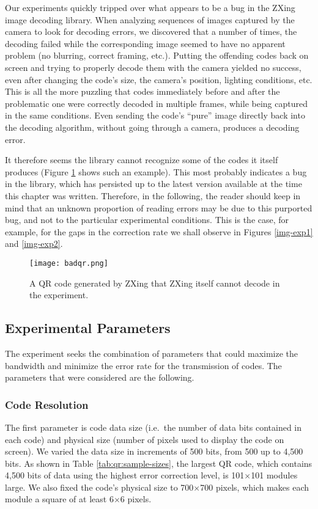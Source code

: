 Our experiments quickly tripped over what appears to be a bug in the ZXing image decoding library. When analyzing sequences of images captured by the camera to look for decoding errors, we discovered that a number of times, the decoding failed while the corresponding image seemed to have no apparent problem (no blurring, correct framing, etc.). Putting the offending codes back on screen and trying to properly decode them with the camera yielded no success, even after changing the code's size, the camera's position, lighting conditions, etc. This is all the more puzzling that codes immediately before and after the problematic one were correctly decoded in multiple frames, while being captured in the same conditions. Even sending the code's ``pure'' image directly back into the decoding algorithm, without going through a camera, produces a decoding error.

It therefore seems the library cannot recognize some of the codes it itself produces (Figure \ref{fig:qr:bad-code} shows such an example). This most probably indicates a bug in the library, which has persisted up to the latest version available at the time this chapter was written. Therefore, in the following, the reader should keep in mind that an unknown proportion of reading errors may be due to this purported bug, and not to the particular experimental conditions. This is the case, for example, for the gaps in the correction rate we shall observe in Figures \ref{img-exp1} and \ref{img-exp2}.

\begin{figure}
\centering
\texttt{[image: badqr.png]}
\caption{A QR code generated by ZXing that ZXing itself cannot decode in the experiment.}
\label{fig:qr:bad-code}
\end{figure}

\subsection{Experimental Parameters}

The experiment seeks the combination of parameters that could maximize the bandwidth and minimize the error rate for the transmission of codes. The parameters that were considered are the following.

\subsubsection{Code Resolution}

The first parameter is code data size (i.e.\ the number of data bits contained in each code) and physical size (number of pixels used to display the code on screen). We varied the data size in increments of 500 bits, from 500 up to 4,500 bits. As shown in Table \ref{tab:qr:sample-sizes}, the largest QR code, which contains 4,500 bits of data using the highest error correction level, is 101$\times$101 modules large. We also fixed the code's physical size to 700$\times$700 pixels, which makes each module a square of at least 6$\times$6 pixels.


